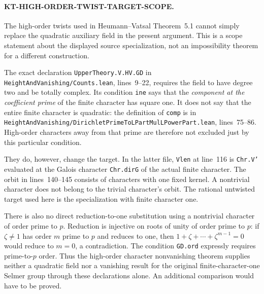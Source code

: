 \paragraph{KT-HIGH-ORDER-TWIST-TARGET-SCOPE.}
The high-order twists used in Heumann--Vatsal Theorem~5.1
cannot simply replace the quadratic auxiliary field in the present
argument. This is a scope statement about the displayed source
specialization, not an impossibility theorem for a different construction.

The exact declaration \texttt{UpperTheory.V.HV.GD} in
\texttt{HeightAndVanishing/Counts.lean}, lines~9--22, requires
the field to have degree two and be totally complex. Its condition
\texttt{ine} says that the \emph{component at the coefficient prime}
of the finite character has square one. It does not say that the
entire finite character is quadratic: the definition of
\texttt{comp} is in
\texttt{HeightAndVanishing/DirichletPrimeToLPartMulLPowerPart.lean},
lines~75--86. High-order characters away from that prime are
therefore not excluded just by this particular condition.

They do, however, change the target. In the latter file,
\texttt{Vlen} at line~116 is
\texttt{Chr.V'} evaluated at the Galois character
\texttt{Chr.dirG} of the actual finite character. The orbit in
lines~140--145 consists of characters with one fixed kernel.
A nontrivial character does not belong to the trivial character's
orbit. The rational untwisted target used here is the
specialization with finite character one.

There is also no direct reduction-to-one substitution using a
nontrivial character of order prime to $p$. Reduction is injective
on roots of unity of order prime to $p$: if $\zeta\ne1$ has
order $m$ prime to $p$ and reduces to one, then
$1+\zeta+\cdots+\zeta^{m-1}=0$ would reduce to $m=0$,
a contradiction. The condition \texttt{GD.ord} expressly
requires prime-to-$p$ order. Thus the high-order character
nonvanishing theorem supplies neither a quadratic field nor a
vanishing result for the original finite-character-one Selmer
group through these declarations alone. An additional comparison
would have to be proved.
